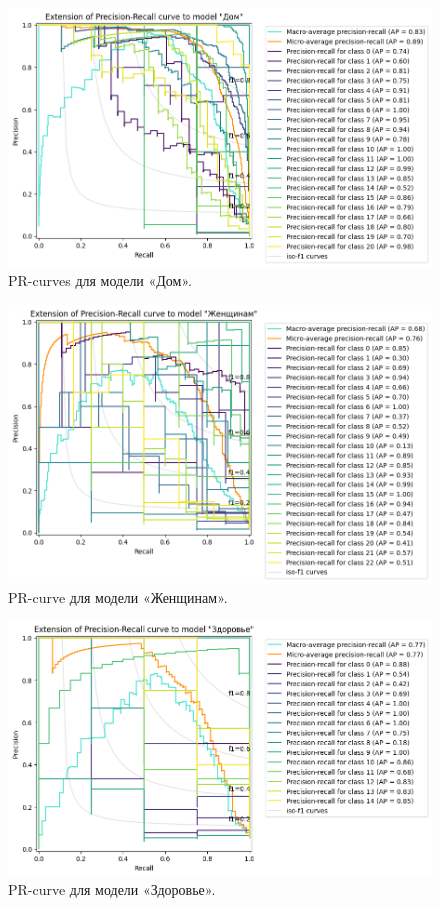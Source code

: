 \documentclass[a4paper,12pt]{extarticle}
\begin{document}
\begin{figure}[hbtp]
	\centering
	\includegraphics[scale=0.7]{pr_curves/prcurve_Дом.png}
	\caption{PR-curves для модели «Дом».}
	\label{fig:prcurve_Дом}
\end{figure}

\begin{figure}[hbtp]
	\centering
	\includegraphics[scale=0.7]{pr_curves/prcurve_Женщинам.png}
	\caption{PR-curve для модели «Женщинам».}
	\label{fig:prcurve_Женщинам}
\end{figure}

\begin{figure}[hbtp]
	\centering
	\includegraphics[scale=0.7]{pr_curves/prcurve_Здоровье.png}
	\caption{PR-curve для модели «Здоровье».}
	\label{fig:prcurve_Здоровье}
\end{figure}
\end{document}
